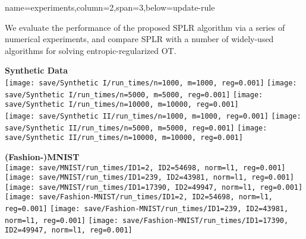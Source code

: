 {name=experiments,column=2,span=3,below=update-rule}
{
    We evaluate the performance of the proposed
    SPLR algorithm via a series of numerical experiments, and compare SPLR with a number of widely-used algorithms for solving entropic-regularized OT.

    \begin{minipage}[c]{0.48\textwidth}
        \centering
        \vspace{0.5em}
        {\bf\color{sufered} Synthetic Data} \\ \vspace{0.3em}
        \texttt{[image: save/Synthetic I/run\_times/n=1000, m=1000, reg=0.001]}
        \texttt{[image: save/Synthetic I/run\_times/n=5000, m=5000, reg=0.001]}
        \texttt{[image: save/Synthetic I/run\_times/n=10000, m=10000, reg=0.001]} \\
        \texttt{[image: save/Synthetic II/run\_times/n=1000, m=1000, reg=0.001]}
        \texttt{[image: save/Synthetic II/run\_times/n=5000, m=5000, reg=0.001]}
        \texttt{[image: save/Synthetic II/run\_times/n=10000, m=10000, reg=0.001]} \\
        
    \end{minipage}
    \hfill
    \begin{minipage}[c]{0.48\textwidth}
        \centering
        \vspace{0.5em}
        {\bf\color{sufered} (Fashion-)MNIST} \\ \vspace{0.3em}
        \texttt{[image: save/MNIST/run\_times/ID1=2, ID2=54698, norm=l1, reg=0.001]}
        \texttt{[image: save/MNIST/run\_times/ID1=239, ID2=43981, norm=l1, reg=0.001]}
        \texttt{[image: save/MNIST/run\_times/ID1=17390, ID2=49947, norm=l1, reg=0.001]} \\
        \texttt{[image: save/Fashion-MNIST/run\_times/ID1=2, ID2=54698, norm=l1, reg=0.001]}
        \texttt{[image: save/Fashion-MNIST/run\_times/ID1=239, ID2=43981, norm=l1, reg=0.001]}
        \texttt{[image: save/Fashion-MNIST/run\_times/ID1=17390, ID2=49947, norm=l1, reg=0.001]}\\
    \end{minipage}

}
